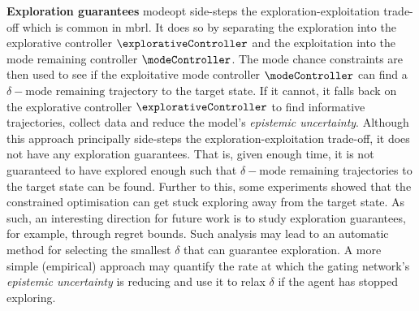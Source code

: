 \documentclass{mimosis-class/mimosis}
\numberwithin{equation}{chapter}
\begin{document}
{\textbf{Exploration guarantees}
\acrshort{modeopt} side-steps the exploration-exploitation trade-off which is common in \acrshort{mbrl}.
It does so by separating the exploration into the explorative controller \(\explorativeController\)
and the exploitation into the mode remaining controller \(\modeController\).
The mode chance constraints are then used to see if the exploitative mode controller \(\modeController\)
can find a \(\delta-\text{mode remaining}\) trajectory to the target state.
If it cannot, it falls back on the explorative controller \(\explorativeController\) to find informative trajectories,
collect data and reduce the model's \emph{epistemic uncertainty}.
Although this approach principally side-steps the  exploration-exploitation trade-off,
it does not have any exploration guarantees.
That is, given enough time, it is not guaranteed to have explored enough
such that \(\delta-\text{mode remaining}\) trajectories to the target state can be found. Further
to this, some experiments showed that the constrained optimisation can get stuck
exploring away from the target state. As such, an interesting direction for future
work is to study exploration guarantees, for example, through regret bounds. Such
analysis may lead to an automatic method for selecting the smallest \(\delta\) that can
guarantee exploration. A more simple (empirical) approach may quantify the rate
at which the gating network’s \emph{epistemic uncertainty} is reducing and use it to relax
\(\delta\) if the agent has stopped exploring.

}
\end{document}
